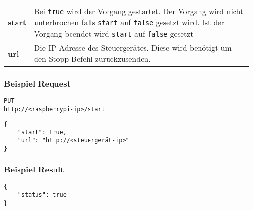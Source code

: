 \begin{tabular}{l p{16cm}}
	\textbf{start} & Bei \texttt{true} wird der Vorgang gestartet. Der Vorgang wird nicht unterbrochen falls \texttt{start} auf \texttt{false} gesetzt wird. Ist der Vorgang beendet wird \texttt{start} auf \texttt{false} gesetzt \\
	\textbf{url} & Die IP-Adresse des Steuergerätes. Diese wird benötigt um den Stopp-Befehl zurückzusenden.
\end{tabular}

\subsubsection{Beispiel Request}

\texttt{PUT} \\
\texttt{http://<raspberrypi-ip>/start}

\begin{lstlisting}[caption=PUT start Request, tabsize=2]
{
	"start": true,
	"url": "http://<steuergerät-ip>"
}
\end{lstlisting}

\subsubsection{Beispiel Result}

\begin{lstlisting}[caption=PUT start Result, tabsize=2]
{
	"status": true
}
\end{lstlisting}